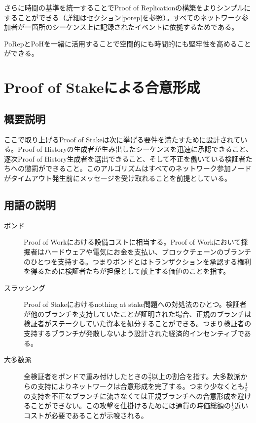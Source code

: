 \documentclass[12pt]{ltjsarticle}
\begin{document}
さらに時間の基準を統一することでProof of Replicationの構築をよりシンプルにすることができる（詳細はセクション\ref{porep}を参照）。すべてのネットワーク参加者が一箇所のシーケンス上に記録されたイベントに依拠するためである。

PoRepとPoHを一緒に活用することで空間的にも時間的にも堅牢性を高めることができる。

\section{Proof of Stakeによる合意形成}\label{proof_of_stake}
\subsection{概要説明}
ここで取り上げるProof of Stakeは次に挙げる要件を満たすために設計されている。Proof of Historyの生成者が生み出したシーケンスを迅速に承認できること、逐次Proof of History生成者を選出できること、そして不正を働いている検証者たちへの懲罰ができること。このアルゴリズムはすべてのネットワーク参加ノードがタイムアウト発生前にメッセージを受け取れることを前提としている。
\subsection{用語の説明}
\begin{description}

\item[ボンド]
Proof of Workにおける設備コストに相当する。Proof of Workにおいて採掘者はハードウェアや電気にお金を支払い、ブロックチェーンのブランチのひとつを支持する。つまりボンドとはトランザクションを承認する権利を得るために検証者たちが担保として献上する価値のことを指す。

\item[スラッシング]

Proof of Stakeにおけるnothing at stake問題への対処法のひとつ\cite{slasher}。検証者が他のブランチを支持していたことが証明された場合、正規のブランチは検証者がステークしていた資本を処分することができる。つまり検証者の支持するブランチが発散しないよう設計された経済的インセンティブである。

\item[大多数派]
全検証者をボンドで重み付けしたときの\(\frac{2}{3}\)以上の割合を指す。大多数派からの支持によりネットワークは合意形成を完了する。つまり少なくとも\(\frac{1}{3}\)の支持を不正なブランチに流さなくては正規ブランチへの合意形成を避けることができない。この攻撃を仕掛けるためには通貨の時価総額の\(\frac{1}{3}\)近いコストが必要であることが示唆される。

\end{description}
\end{document}

